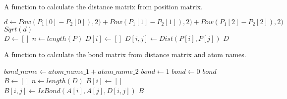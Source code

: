 \begin{algorithm}
\caption{A function to calculate the distance matrix from position matrix.}
\label{alg:PositionToDistanceMatrix}
\begin{algorithmic}[1]
        \State $d \gets Pow(P_1[0] - P_2[0]), 2) + 
                        Pow(P_1[1] - P_2[1]), 2) + 
                        Pow(P_1[2] - P_2[2]), 2)$
        \State \Return $Sqrt(d)$
    \EndProcedure
    \\
        \State $D \gets []$
        \State $n \gets length(P)$
            \State $D[i] \gets []$
                \State $D[i, j] \gets Dist(P[i], P[j])$
            \EndFor
        \EndFor
        \State \Return $D$
    \EndProcedure
\end{algorithmic}
\end{algorithm}

\begin{algorithm}
\caption{A function to calculate the bond matrix from distance matrix and atom names.}
\label{alg:DistanceToBondMatrix}
\begin{algorithmic}[1]
        \State $bond\_name \gets atom\_name\_1 + atom\_name\_2$
            \State $bond \gets 1$
        \Else
            \State$bond \gets 0$
        \EndIf
        \State \Return $bond$
    \EndProcedure
    \\
        \State $B \gets []$
        \State $n \gets length(D)$
            \State $B[i] \gets []$
                \State $B[i, j] \gets IsBond(A[i], A[j], D[i, j])$
            \EndFor
        \EndFor
        \State \Return $B$
    \EndProcedure
\end{algorithmic}
\end{algorithm}

